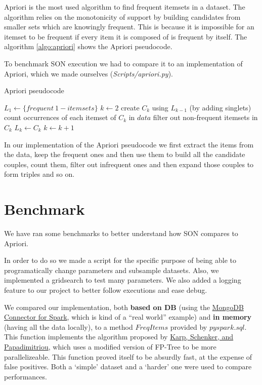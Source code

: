 \documentclass[a4paper]{article}
\begin{document}
	Apriori is the most used algorithm to find frequent itemsets in a dataset. The algorithm relies on the monotonicity of support by building candidates from smaller sets which are knowingly frequent. This is because it is impossible for an itemset to be frequent if every item it is composed of is frequent by itself. The algorithm \ref{algo:apriori} shows the Apriori pseudocode.
	
	To benchmark SON execution we had to compare it to an implementation of Apriori, which we made ourselves (\textit{Scripts/apriori.py}).
	
\begin{algorithm}
\caption{Apriori pseudocode}
\label{algo:apriori}
\begin{algorithmic}[1]
	\State $L_1 \gets \{frequent \ 1-itemsets\}$ 
    	\State $k \gets 2$
    		\State create $C_k$ using $L_{k-1}$ (by adding singlets) 
    		\State count occurrences of each itemset of $C_k$ in $data$
    		\State filter out non-frequent itemsets in $C_k$
    		\State $L_k \gets C_k$
    		\State $k \gets k+1$
    	\EndWhile
\EndFunction
\end{algorithmic}
\end{algorithm}

    In our implementation of the Apriori pseudocode we first extract the items from the data, keep the frequent ones and then use them to build all the candidate couples, count them, filter out infrequent ones and then expand those couples to form triples and so on.
	
	\section{Benchmark}
	We have ran some benchmarks to better understand how SON compares to Apriori.
	
	In order to do so we made a script for the specific purpose of being able to programatically change parameters and 	subsample datasets.
	Also, we implemented a gridsearch to test many parameters. We also added a logging feature to our project to better follow executions and ease debug.
	
	We compared our implementation, both \textbf{based on DB} (using the \href{https://www.mongodb.com/docs/spark-connector/current/}{MongoDB Connector for Spark}, which is kind of a ``real world'' example) and \textbf{in memory} (having all the data locally), to a method $FreqItems$ provided by $pyspark.sql$. 
	This function implements the algorithm proposed by \href{https://doi.org/10.1145/762471.762473}{Karp, Schenker, and Papadimitriou}, which uses a modified version of FP-Tree to be more parallelizeable. This function proved itself to be absurdly fast, at the expense of false positives.
	Both a  `simple' dataset and a `harder' one were used to compare performances.
\end{document}
